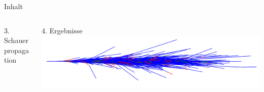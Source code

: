 \documentclass[aspectratio=1610, captions=tableheading, 11pt]{beamer}
\begin{document}
\begin{frame}{Inhalt}
\begin{columns}
\begin{column}{0.4\textwidth}
       \end{column}
   \end{columns}
   \begin{columns}
       \begin{column}{0.4\textwidth}


            \begin{block}{3. Schauerpropagation}
            \end{block}
       \end{column}
       \begin{column}{0.4\textwidth}


           \begin{block}{4. Ergebnisse}
              \centering
                \vspace{2mm}
              \includegraphics[height=0.15\textheight]{plots/shower_nolegend.png}
                \vspace{2mm}
           \end{block}
       \end{column}
   \end{columns}
\end{frame}


\end{document}
